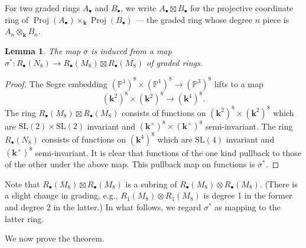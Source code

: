 \documentclass{amsart}
\newtheorem{lemma}[theorem]{Lemma}
\theoremstyle{definition}
\theoremstyle{remark}
\DeclareMathOperator{\Proj}{Proj}
\def\SL{\mathrm{SL}}
\def\fieldk{\mathbf{k}}
\def\P{\mathbb{P}}
\begin{document}
For two graded rings $A_{\bullet}$ and $B_{\bullet}$, we write
$A_{\bullet} \boxtimes B_{\bullet}$ for the projective
coordinate ring of $\Proj(A_{\bullet}) \times_{\fieldk}
\Proj(B_{\bullet})$ ---  the graded ring
whose degree $n$ piece is $A_n \otimes_{\fieldk} B_n$. 

\begin{lemma}
The map $\sigma$ is induced from a map $\sigma^*:R_{\bullet}(N_8) \to R_{\bullet}(M_8) \boxtimes R_{\bullet}(M_8)$
of graded rings.
\end{lemma}

\begin{proof}
The Segre embedding $(\P^1)^8 \times (\P^1)^8 \to (\P^3)^8$ lifts to a map
\begin{displaymath}
(\fieldk^2)^8 \times (\fieldk^2)^8 \to (\fieldk^4)^8.
\end{displaymath}
The ring $R_{\bullet}(M_8) \boxtimes R_{\bullet}(M_8)$ consists of functions on $(\fieldk^2)^8 \times (\fieldk^2)^8$
which are $\SL(2) \times \SL(2)$ invariant and $(\fieldk^{\times})^8 \times (\fieldk^{\times})^8$ semi-invariant.  The ring
$R_{\bullet}(N_8)$ consists of functions on $(\fieldk^4)^8$ which are $\SL(4)$ invariant and $(\fieldk^{\times})^8$
semi-invariant.  It is clear that functions of the one kind pullback to those of the other under the above map.
This pullback map on functions is $\sigma^*$.
\end{proof}

Note that $R_{\bullet}(M_8) \boxtimes R_{\bullet}(M_8)$ is a subring of $R_{\bullet}(M_8) \otimes R_{\bullet}(M_8)$.
(There is a slight change in grading, e.g., $R_1(M_8) \otimes R_1(M_8)$ is degree 1 in the former and degree 2 in
the latter.)  In what follows, we regard $\sigma^*$ as mapping to the latter ring.

We now prove the theorem.
\end{document}
